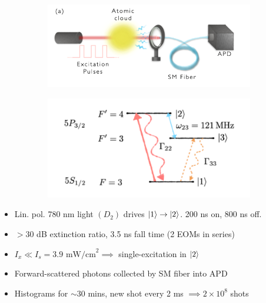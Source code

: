\documentclass{beamer}
\theoremstyle{definition}
\begin{document}
\begin{frame}
	
	
	\begin{figure}[!htb]
		\begin{subfigure}{0.55\textwidth}
			\includegraphics[width=\textwidth]{experiment.png}
		\end{subfigure}
		\begin{subfigure}{0.44\textwidth}
			\includegraphics[width=\textwidth]{Rb85_levels.png}
		\end{subfigure}
	\end{figure}
	
\begin{itemize}
	\item Lin. pol. 780 nm light $(D_2)$ drives $\ket{1}\to \ket{2}$. 200 ns on, 800 ns off.  
	\item $> 30$ dB extinction ratio, 3.5 ns fall time (2 EOMs in series)
	\item $I_x \ll I_s = 3.9 \text{ mW/cm}^2 \implies$ single-excitation in $\ket{2}$
	\item Forward-scattered photons collected by SM fiber into APD 
	\item Histograms for $\sim$30 mins, new shot every 2 ms $\implies 2\times 10^8$ shots 
	
\end{itemize}
\end{frame}
\end{document}
